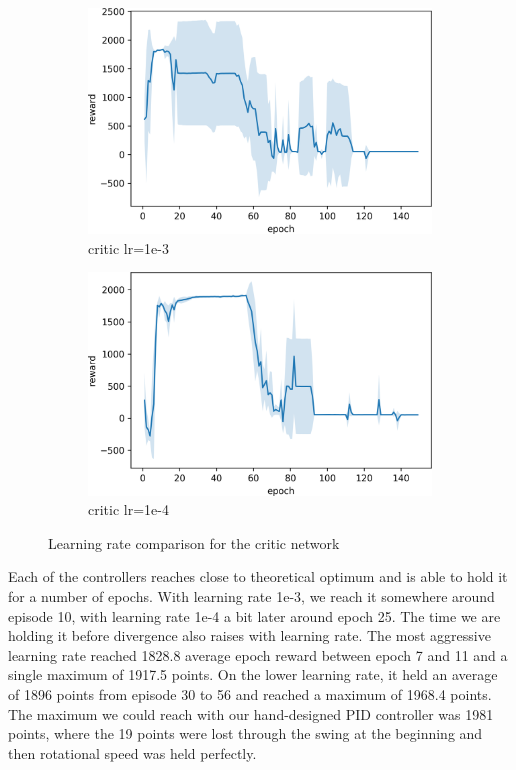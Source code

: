 \documentclass[hyperref,beleg]{cgvpub}
\begin{document}
\begin{figure}
\centering
\begin{subfigure}{.5\textwidth}
  \centering
  \includegraphics[width=.8\linewidth]{images/plot_critic_1e-3.png}
  \caption{critic lr=1e-3}
\end{subfigure}%
\begin{subfigure}{.5\textwidth}
  \centering
  \includegraphics[width=.8\linewidth]{images/plot_critic_1e-4.png}
  \caption{critic lr=1e-4}
\end{subfigure}
\caption{Learning rate comparison for the critic network}
\label{fig:critic_lr}
\end{figure}

Each of the controllers reaches close to theoretical optimum and is able to hold it for a number of epochs. With learning rate 1e-3, we reach it somewhere around episode 10, with learning rate 1e-4 a bit later around epoch 25. The time we are holding it before divergence also raises with learning rate. The most aggressive learning rate reached 1828.8 average epoch reward between epoch 7 and 11 and a single maximum of 1917.5 points. On the lower learning rate, it held an average of 1896 points from episode 30 to 56 and reached a maximum of 1968.4 points. The maximum we could reach with our hand-designed PID controller was 1981 points, where the 19 points were lost through the swing at the beginning and then rotational speed was held perfectly.
\end{document}
